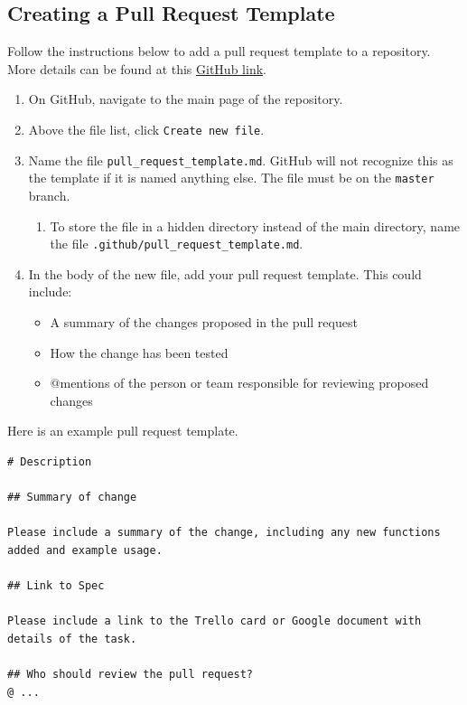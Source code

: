 \documentclass[
]{book}
\providecommand{\tightlist}{%
  \setlength{\itemsep}{0pt}\setlength{\parskip}{0pt}}
\begin{document}
\hypertarget{creating-a-pull-request-template}{%
\subsection{Creating a Pull Request Template}\label{creating-a-pull-request-template}}

Follow the instructions below to add a pull request template to a repository. More details can be found at this \href{https://help.github.com/en/github/building-a-strong-community/creating-a-pull-request-template-for-your-repository}{GitHub link}.

\begin{enumerate}
\def\labelenumi{\arabic{enumi}.}
\tightlist
\item
  On GitHub, navigate to the main page of the repository.
\item
  Above the file list, click \texttt{Create\ new\ file}.
\item
  Name the file \texttt{pull\_request\_template.md}. GitHub will not recognize this as the template if it is named anything else. The file must be on the \texttt{master} branch.

  \begin{enumerate}
  \def\labelenumii{\arabic{enumii}.}
  \tightlist
  \item
    To store the file in a hidden directory instead of the main directory, name the file \texttt{.github/pull\_request\_template.md}.
  \end{enumerate}
\item
  In the body of the new file, add your pull request template. This could include:

  \begin{itemize}
  \tightlist
  \item
    A summary of the changes proposed in the pull request
  \item
    How the change has been tested
  \item
    @mentions of the person or team responsible for reviewing proposed changes
  \end{itemize}
\end{enumerate}

Here is an example pull request template.

\begin{verbatim}
# Description

## Summary of change

Please include a summary of the change, including any new functions added and example usage. 

## Link to Spec

Please include a link to the Trello card or Google document with details of the task. 

## Who should review the pull request?
@ ...
\end{verbatim}
\end{document}
